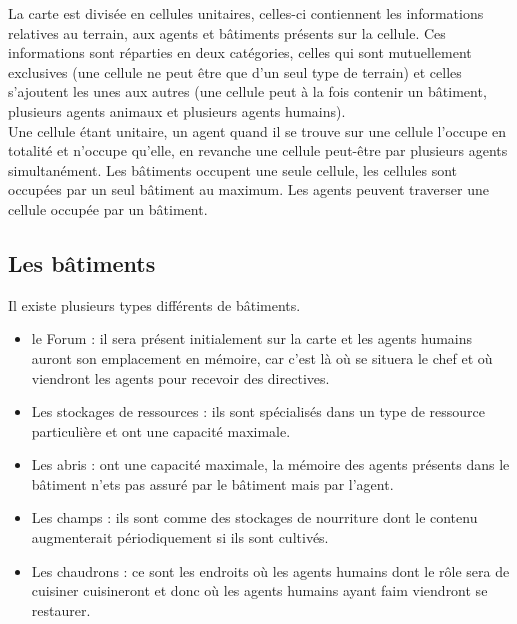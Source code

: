 \documentclass[12pt]{article}
\begin{document}

La carte est divisée en cellules unitaires, celles-ci contiennent les 
informations relatives au terrain, aux agents et bâtiments présents sur la 
cellule. Ces informations sont réparties en deux catégories, celles qui sont 
mutuellement exclusives (une cellule ne peut être que d'un seul type de 
terrain) et celles s'ajoutent les unes aux autres (une cellule peut à la fois 
contenir un bâtiment, plusieurs agents animaux et plusieurs agents humains).\\

Une cellule étant unitaire, un agent quand il se trouve sur une cellule 
l'occupe en totalité et n'occupe qu'elle, en revanche une cellule peut-être 
par plusieurs agents simultanément. Les bâtiments occupent une seule cellule, 
les cellules sont occupées par un seul bâtiment au maximum. Les agents peuvent 
traverser une cellule occupée par un bâtiment.

	\subsection{Les bâtiments}

Il existe plusieurs types différents de bâtiments.
	\begin{itemize}
	
	\item le Forum : il sera présent initialement sur la carte et les 
agents humains auront son emplacement en mémoire, car c'est là où se situera 
le chef et où viendront les agents pour recevoir des directives.

	\item Les stockages de ressources : ils sont spécialisés dans un type 
de ressource particulière et ont une capacité maximale.

	\item Les abris : ont une capacité maximale, la mémoire des agents 
présents dans le bâtiment n'ets pas assuré par le bâtiment mais par l'agent.

	\item Les champs : ils sont comme des stockages de nourriture dont 
le contenu augmenterait périodiquement si ils sont cultivés.

	\item Les chaudrons : ce sont les endroits où les agents humains dont 
le rôle sera de cuisiner cuisineront et donc où les agents humains ayant faim 
viendront se restaurer.

	\end{itemize}
\end{document}
